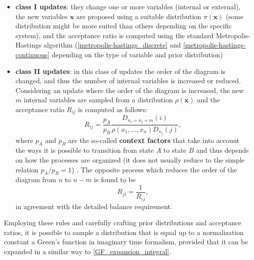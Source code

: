 \begin{itemize}
    \item \textbf{class I updates}: they change one or more variables (internal or external), the new variables $\mathbf{x}$ are proposed using a suitable
    distribution $\pi(\mathbf{x})$ (some distribution might be more suited than others depending on the specific system), and the acceptance ratio is computed using 
    the standard Metropolis-Hastings algorithm (\ref{metropolis-hastings_discrete} and \ref{metropolis-hastings-continuous} depending on the type of variable and prior 
    distribution)
    \item \textbf{class II updates}: in this class of updates the order of the diagram is changed, and thus the number of internal variables is increased or 
    reduced. Considering an update where the order of the diagram is increased, the new $m$ internal variables are sampled from a distribution $\rho(\mathbf{x})$ 
    and the acceptance ratio $R_{ij}$ is computed as follows:
    \begin{equation}
        R_{ij}=\frac{p_A}{p_B}\frac{D_{n_i=n_j+m}(i)}{\rho(x_1,...,x_n)D_{n_j}(j)},
    \end{equation}
    where $p_A$ and $p_B$ are the so-called \textbf{context factors} that take into account the ways it is possible to transition from state $A$ to 
    state $B$ and thus depends on how the processes are organized (it does not usually reduce to the simple relation $p_A/p_B=1$) \cite{fehske2007computational}. The 
    opposite process which reduces the order of the diagram from $n$ to $n-m$ is found to be 
    \begin{equation}
        R_{ji}=\frac{1}{R_{ij}},
    \end{equation}
    in agreement with the detailed balance requirement.
\end{itemize}
Employing these rules and carefully crafting prior distributions and acceptance ratios, it is possible to sample a distribution that is 
equal up to a normalization constant a Green's function in imaginary time formalism, provided that it can be expanded in a similar way to \ref{GF_expansion_integral}.
